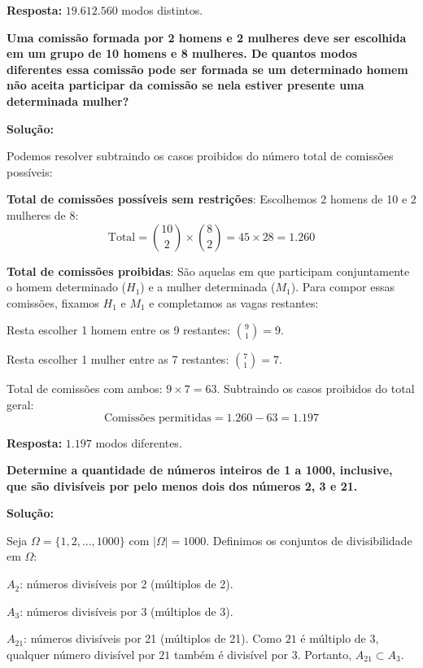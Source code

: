 \documentclass[a4paper,10pt,landscape,twocolumn]{article}  %
\let\oldenumerate\enumerate
\let\oldendenumerate\endenumerate
\renewenvironment{enumerate}{%
  \oldenumerate%
  \setlength{\itemsep}{1pt}%
  \setlength{\parskip}{0pt}%
  \setlength{\parsep}{0pt}%
  \setlength{\topsep}{2pt}%
  \setlength{\partopsep}{0pt}%
}{%
  \oldendenumerate%
}
\let\olditemize\itemize
\let\oldenditemize\enditemize
\renewenvironment{itemize}{%
  \olditemize%
  \setlength{\itemsep}{1pt}%
  \setlength{\parskip}{0pt}%
  \setlength{\parsep}{0pt}%
  \setlength{\topsep}{2pt}%
  \setlength{\partopsep}{0pt}%
}{%
  \oldenditemize%
}
\begin{document}
\begin{enumerate}
    \textbf{Resposta:} $19.612.560$ modos distintos.

    \item \textbf{Uma comissão formada por 2 homens e 2 mulheres deve ser escolhida em um grupo de 10 homens e 8 mulheres. De quantos modos diferentes essa comissão pode ser formada se um determinado homem não aceita participar da comissão se nela estiver presente uma determinada mulher?}
    
    \textbf{Solução:}
    
    Podemos resolver subtraindo os casos proibidos do número total de comissões possíveis:
    \begin{enumerate}
        \item \textbf{Total de comissões possíveis sem restrições}: Escolhemos 2 homens de 10 e 2 mulheres de 8:
        \[ \text{Total} = \binom{10}{2} \times \binom{8}{2} = 45 \times 28 = 1.260 \]
        \item \textbf{Total de comissões proibidas}: São aquelas em que participam conjuntamente o homem determinado ($H_1$) e a mulher determinada ($M_1$). Para compor essas comissões, fixamos $H_1$ e $M_1$ e completamos as vagas restantes:
        \begin{itemize}
            \item Resta escolher 1 homem entre os 9 restantes: $\binom{9}{1} = 9$.
            \item Resta escolher 1 mulher entre as 7 restantes: $\binom{7}{1} = 7$.
            \item Total de comissões com ambos: $9 \times 7 = 63$.
        \end{itemize}
    \end{enumerate}
    Subtraindo os casos proibidos do total geral:
    \[ \text{Comissões permitidas} = 1.260 - 63 = 1.197 \]
    
    \textbf{Resposta:} $1.197$ modos diferentes.

    \item \textbf{Determine a quantidade de números inteiros de 1 a 1000, inclusive, que são divisíveis por pelo menos dois dos números 2, 3 e 21.}
    
    \textbf{Solução:}
    
    Seja $\Omega = \{1, 2, \dots, 1000\}$ com $|\Omega| = 1000$. Definimos os conjuntos de divisibilidade em $\Omega$:
    \begin{itemize}
        \item $A_2$: números divisíveis por 2 (múltiplos de 2).
        \item $A_3$: números divisíveis por 3 (múltiplos de 3).
        \item $A_{21}$: números divisíveis por 21 (múltiplos de 21).
    \end{itemize}
    Como $21$ é múltiplo de $3$, qualquer número divisível por $21$ também é divisível por $3$. Portanto, $A_{21} \subset A_3$.
    

\end{enumerate}
\end{document}
